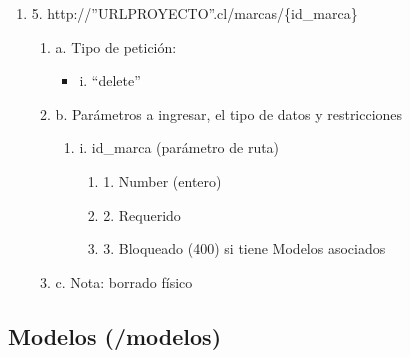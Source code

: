 \begin{enumerate}
    \item 5. http://”URLPROYECTO”.cl/marcas/\{id\_marca\}
    \begin{enumerate}
        \item a. Tipo de petición:
            \begin{itemize}
               \item i. “delete”
            \end{itemize}
        \item b. Parámetros a ingresar, el tipo de datos y restricciones
            \begin{enumerate}
                \item i. id\_marca (parámetro de ruta)
                    \begin{enumerate}
                        \item 1. Number (entero)
                        \item 2. Requerido
                        \item 3. Bloqueado (400) si tiene Modelos asociados
                    \end{enumerate}
            \end{enumerate}
        \item c. Nota: borrado físico
    \end{enumerate}
\end{enumerate}

\subsection{Modelos (/modelos)}

